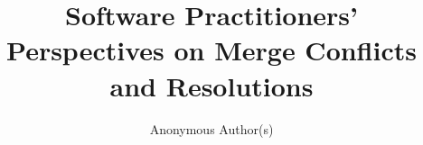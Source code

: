 \documentclass[conference]{IEEEtran}
\begin{document}
\title{Software Practitioners' Perspectives on Merge Conflicts and Resolutions}

\author{Anonymous Author(s)}

\maketitle

\IEEEpeerreviewmaketitle







%


{}
\end{document}
